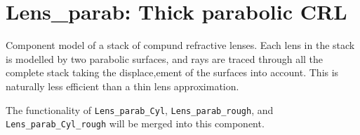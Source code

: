 \section{Lens\_parab: Thick parabolic CRL}

Component model of a stack of compund refractive lenses. Each lens in the stack is modelled by two parabolic surfaces, and rays are traced through all the complete stack  taking the displace,ement of the surfaces into account. This is naturally less efficient than a thin lens approximation.

The functionality of \texttt{Lens\_parab\_Cyl}, \texttt{Lens\_parab\_rough}, and \texttt{Lens\_parab\_Cyl\_rough} will be merged into this component.
